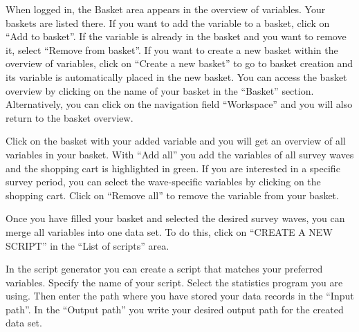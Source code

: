 \documentclass[letterpaper,10pt,openany,onesideH,english]{sphinxmanual}
\begin{document}
\begin{figure}[H]
\centering

\noindent{}
\end{figure}

When logged in, the Basket area appears in the overview of variables. Your baskets are listed there. If you want to add the variable to a basket, click on “Add to basket”. If the variable is already in the basket and you want to remove it, select “Remove from basket”. If you want to create a new basket within the overview of variables, click on “Create a new basket” to go to basket creation and its variable is automatically placed in the new basket. You can access the basket overview by clicking on the name of your basket in the “Basket” section. Alternatively, you can click on the navigation field “Workspace” and you will also return to the basket overview.

\begin{figure}[H]
\centering

\noindent{}
\end{figure}

Click on the basket with your added variable and you will get an overview of all variables in your basket. With “Add all” you add the variables of all survey waves and the shopping cart is highlighted in green. If you are interested in a specific survey period, you can select the wave-specific variables by clicking on the shopping cart. Click on “Remove all” to remove the variable from your basket.

\begin{figure}[H]
\centering

\noindent{}
\end{figure}

Once you have filled your basket and selected the desired survey waves, you can merge all variables into one data set. To do this, click on “CREATE A NEW SCRIPT” in the “List of scripts” area.

\begin{figure}[H]
\centering

\noindent{}
\end{figure}

In the script generator you can create a script that matches your preferred variables. Specify the name of your script. Select the statistics program you are using. Then enter the path where you have stored your data records in the “Input path”. In the “Output path” you write your desired output path for the created data set.
\end{document}
